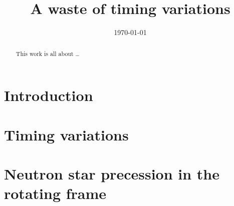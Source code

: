 \documentclass[twoside]{thesis}
\begin{document}
\def\biblio{}

\frontmatter
\title      {A waste of timing variations}
\date       {\today}
\subject    {}
\keywords   {}
\maketitle
\begin{abstract}
This work is all about \dots
\end{abstract}
\tableofcontents




\mainmatter

\chapter{Introduction}
\label{sec: neutron star physics}


\chapter{Timing variations}
\label{sec: timing variations}


\chapter{Neutron star precession in the rotating frame}
\label{sec: rotating frame}

\end{document}
